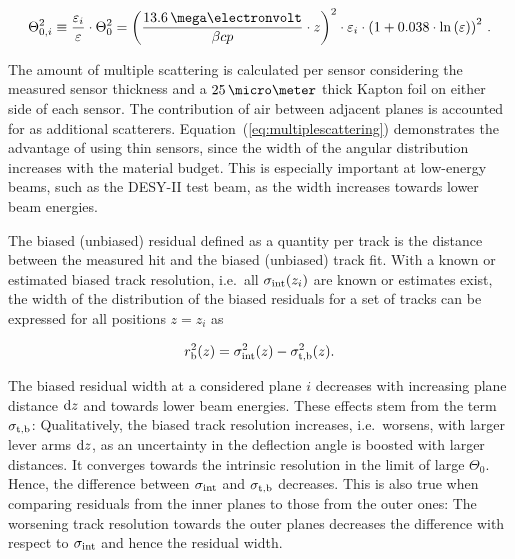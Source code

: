 \begin{equation}
\label{eq:multiplescattering}
\Theta_{0,i}^{2} \equiv \dfrac{\varepsilon_i}{\varepsilon} \cdot \Theta_{0}^{2} = \left( \frac{13.6\,\mega\electronvolt}{\beta c p} \cdot z \right)^2
\cdot \varepsilon_i
\cdot \left( 1 + 0.038 \cdot \ln{\left( \varepsilon \right) } \right)^2 \,.
\end{equation}

The amount of multiple scattering is calculated per sensor considering the measured sensor thickness and a $25\,\micro\meter$ thick Kapton foil on either side of each sensor.
The contribution of air between adjacent planes is accounted for as additional scatterers. 
Equation~(\ref{eq:multiplescattering}) demonstrates the advantage of using thin sensors, since the width of the angular distribution increases with the material budget.
This is especially important at low-energy beams, such as the DESY-II test beam, as the width increases towards lower beam energies.

The biased (unbiased) residual defined as a quantity per track is the distance between the measured hit and the biased (unbiased) track fit. 
With a known or estimated biased track resolution, i.e.\ all $\sigma_{\textrm{int}}(z_i)$ are known or estimates exist,
 the width of the distribution of the \textrm{biased} residuals for a set of tracks can be expressed for all positions $z = z_i$ as

\begin{equation}
 \label{eq:telescoperesolutionequation1}
 r_{\textrm{b}}^2(z) = \sigma_{\textrm{int}}^2(z) - \sigma_{\textrm{t,b}}^2(z).
\end{equation}

\noindent
The biased residual width at a considered plane $i$ decreases with increasing plane distance $\textrm{d}z$ and towards lower beam energies. 
These effects stem from the term $\sigma_{\textrm{t,b}}$: 
Qualitatively, the biased track resolution increases, i.e.\ worsens, with larger lever arms $\textrm{d}z$, as an uncertainty in the deflection angle is boosted with larger distances. 
It converges towards the intrinsic resolution in the limit of large $\Theta_0$. 
Hence, the difference between $\sigma_{\textrm{int}}$ and $\sigma_{\textrm{t,b}}$ decreases. 
This is also true when comparing residuals from the inner planes to those from the outer ones:
The worsening track resolution towards the outer planes decreases the difference with respect to $\sigma_{\textrm{int}}$ and hence the residual width. 

